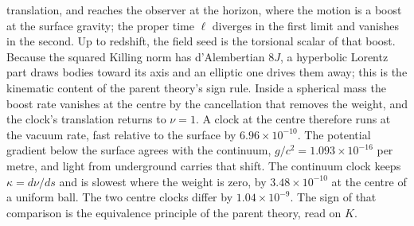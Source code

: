 \documentclass[a4paper]{article}
\begin{document}
translation, and reaches the observer at the horizon, where the motion is a boost at the surface gravity; the proper time \(\ell\) diverges in the first limit and vanishes in the second. Up to redshift, the field seed is the torsional scalar of that boost. Because the squared Killing norm has d'Alembertian \(8J\), a hyperbolic Lorentz part draws bodies toward its axis and an elliptic one drives them away; this is the kinematic content of the parent theory's sign rule. Inside a spherical mass the boost rate vanishes at the centre by the cancellation that removes the weight, and the clock's translation returns to \(\nu=1\). A clock at the centre therefore runs at the vacuum rate, fast relative to the surface by \(6.96\times 10^{-10}\). The potential gradient below the surface agrees with the continuum, \(g/c^{2}=1.093\times 10^{-16}\) per metre, and light from underground carries that shift. The continuum clock keeps \(\kappa=d\nu/ds\) and is slowest where the weight is zero, by \(3.48\times 10^{-10}\) at the centre of a uniform ball. The two centre clocks differ by \(1.04\times 10^{-9}\). The sign of that comparison is the equivalence principle of the parent theory, read on \(K\).
\end{document}
